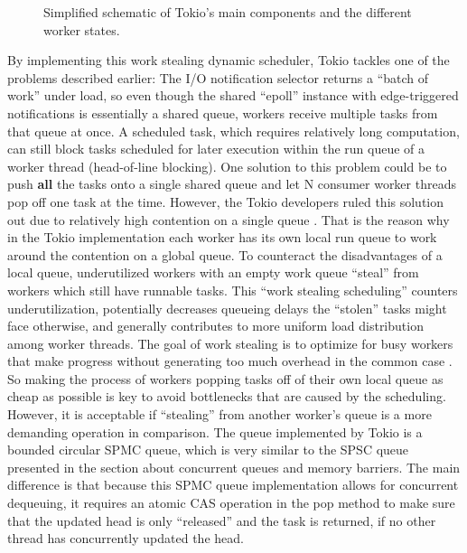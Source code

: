 \begin{figure}
  \centering
  \caption{Simplified schematic of Tokio's main components and the different worker states.}
  \label{fig:tokio_arch}
\end{figure}
By implementing this work stealing dynamic scheduler, Tokio tackles one of the problems described earlier:  \newline
The I/O notification selector returns a “batch of work” under load, so even though the shared “epoll” instance with edge-triggered notifications is essentially a shared queue, workers  receive multiple tasks from that queue at once. A scheduled task, which requires relatively long computation, can still block tasks scheduled for later execution within the run queue of a worker thread (head-of-line blocking). One solution to this problem could be to push \textbf{all} the tasks onto a single shared queue and let N consumer worker threads pop off one task at the time. However, the Tokio developers ruled this solution out due to relatively high contention on a single queue \cite{lerche:scheduler}. That is the reason why in the Tokio implementation each worker has its own local run queue to work around the contention on a global queue. To counteract the disadvantages of a local queue, underutilized workers with an empty work queue “steal” from workers which still have runnable tasks. This “work stealing scheduling” counters underutilization, potentially decreases queueing delays the “stolen” tasks might face otherwise, and generally contributes to more uniform load distribution among worker threads. The goal of work stealing is to optimize for busy workers that make progress without generating too much overhead in the common case \cite[380]{herlihy:art_of_mp}. So making the process of workers popping tasks off of their own local queue as cheap as possible is key to avoid bottlenecks that are caused by the scheduling. However, it is acceptable if “stealing” from another worker’s queue is a more demanding operation in comparison. The queue implemented by Tokio is a bounded circular SPMC queue, which is very similar to the SPSC queue presented in the section about concurrent queues and memory barriers. The main difference is that because this SPMC queue implementation allows for concurrent dequeuing, it requires an atomic CAS operation in the pop method to make sure that the updated head is only “released” and the task is returned, if no other thread has concurrently updated the head. \newline
